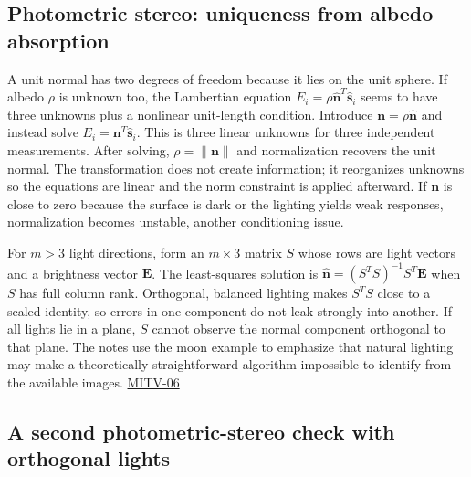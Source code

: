 \subsection{Photometric stereo: uniqueness from albedo absorption}\label{04-visual-computing-ii-ch032-photometric-stereo-uniqueness-from-albedo-absorption}

\hypertarget{04-visual-computing-ii-ch032-photometric-stereo-uniqueness-from-albedo-absorption}{}

A unit normal has two degrees of freedom because it lies on the unit sphere. If albedo \(\rho\) is unknown too, the Lambertian equation \(E_i=\rho\hat{\mathbf n}^T\hat{\mathbf s}_i\) seems to have three unknowns plus a nonlinear unit-length condition. Introduce \(\mathbf n=\rho\hat{\mathbf n}\) and instead solve \(E_i=\mathbf n^T\hat{\mathbf s}_i\). This is three linear unknowns for three independent measurements. After solving, \(\rho=\|\mathbf n\|\) and normalization recovers the unit normal. The transformation does not create information; it reorganizes unknowns so the equations are linear and the norm constraint is applied afterward. If \(\mathbf n\) is close to zero because the surface is dark or the lighting yields weak responses, normalization becomes unstable, another conditioning issue.

For \(m>3\) light directions, form an \(m\times3\) matrix \(S\) whose rows are light vectors and a brightness vector \(\mathbf E\). The least-squares solution is \(\hat{\mathbf n}=(S^TS)^{-1}S^T\mathbf E\) when \(S\) has full column rank. Orthogonal, balanced lighting makes \(S^TS\) close to a scaled identity, so errors in one component do not leak strongly into another. If all lights lie in a plane, \(S\) cannot observe the normal component orthogonal to that plane. The notes use the moon example to emphasize that natural lighting may make a theoretically straightforward algorithm impossible to identify from the available images. \hyperref[04-visual-computing-ii-ch036-mitv-06---photometric-stereo-noise-gain-error-amplification-eigenvalues-and-eigenvectors-review]{MITV-06}

\subsection{A second photometric-stereo check with orthogonal lights}\label{04-visual-computing-ii-ch032-a-second-photometric-stereo-check-with-orthogonal-lights}

\hypertarget{04-visual-computing-ii-ch032-a-second-photometric-stereo-check-with-orthogonal-lights}{}

